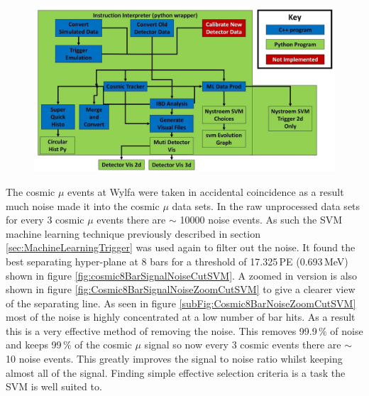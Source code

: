 \begin{figure}[htbp]
 \centering
 \includegraphics[width=1.0\linewidth]{Chapter5/Figs/Raster/analysisChain.jpg}
 \label{fig:analysisChain}
\end{figure}

The cosmic $\mu$ events at Wylfa were taken in accidental coincidence as a result much noise made it into the cosmic $\mu$ data sets. In the raw unprocessed data sets for every 3 cosmic $\mu$ events there are $\sim$ 10000 noise events. As such the SVM machine learning technique previously described in section \ref{sec:MachineLearningTrigger} was used again to filter out the noise. It found the best separating hyper-plane at 8 bars for a threshold of 17.325\,PE (0.693\,MeV) shown in figure \ref{fig:cosmic8BarSignalNoiseCutSVM}. A zoomed in version is also shown in figure \ref{fig:Cosmic8BarSignalNoiseZoomCutSVM} to give a clearer view of the separating line. As seen in figure \ref{subFig:Cosmic8BarNoiseZoomCutSVM} most of the noise is highly concentrated at a low number of bar hits. As a result this is a very effective method of removing the noise. This removes 99.9\,\% of noise and keeps 99\,\% of the cosmic $\mu$ signal so now every 3 cosmic events there are $\sim$ 10 noise events. This greatly improves the signal to noise ratio whilst keeping almost all of the signal. Finding simple effective selection criteria is a task the SVM is well suited to. 

